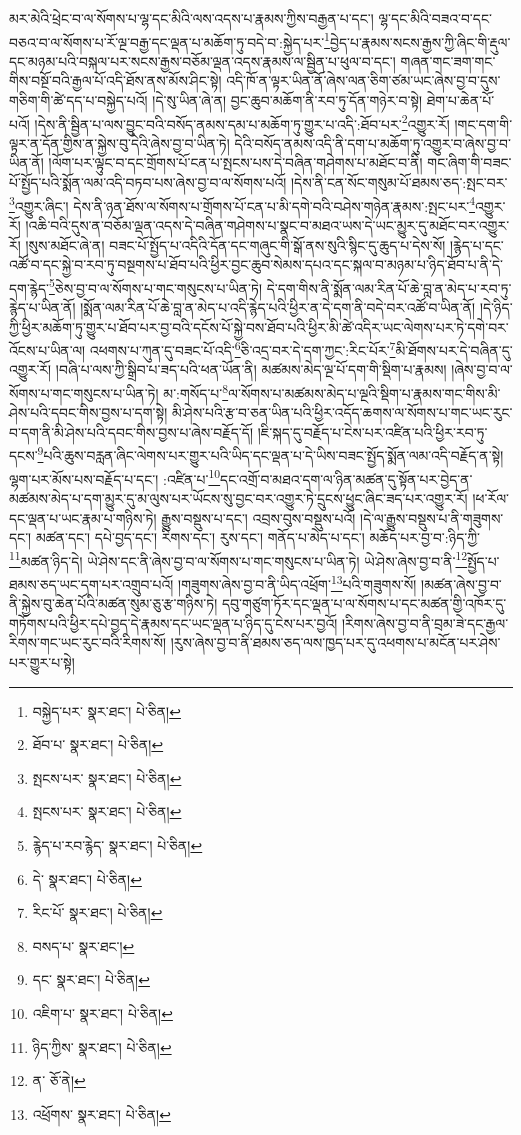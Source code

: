 མར་མེའི་ཕྲེང་བ་ལ་སོགས་པ་ལྷ་དང་མིའི་ལས་འདས་པ་རྣམས་ཀྱིས་བརྒྱན་པ་དང་། ལྷ་དང་མིའི་བཟའ་བ་དང་བཅའ་བ་ལ་སོགས་པ་རོ་ལྔ་བརྒྱ་དང་ལྡན་པ་མཆོག་ཏུ་བདེ་བ་:སྐྱེད་པར་\footnote{བསྐྱེད་པར་  སྣར་ཐང་།  པེ་ཅིན། }བྱེད་པ་རྣམས་སངས་རྒྱས་ཀྱི་ཞིང་གི་རྡུལ་དང་མཉམ་པའི་བསྐལ་པར་སངས་རྒྱས་བཅོམ་ལྡན་འདས་རྣམས་ལ་སྦྱིན་པ་ཕུལ་བ་དང་། གཞན་གང་ཟག་གང་གིས་བསྔོ་བའི་རྒྱལ་པོ་འདི་ཐོས་ནས་མོས་ཤིང་སྟེ། འདི་ཁོ་ན་ལྟར་ཡིན་ནོ་ཞེས་ལན་ཅིག་ཙམ་ཡང་ཞེས་བྱ་བ་དུས་གཅིག་གི་ཚེ་དད་པ་བསྐྱེད་པའོ། །དེ་སུ་ཡིན་ཞེ་ན། བྱང་ཆུབ་མཆོག་ནི་རབ་ཏུ་དོན་གཉེར་བ་སྟེ། ཐེག་པ་ཆེན་པོ་པའོ། །དེས་ནི་སྦྱིན་པ་ལས་བྱུང་བའི་བསོད་ནམས་དམ་པ་མཆོག་ཏུ་གྱུར་པ་འདི་:ཐོབ་པར་\footnote{ཐོབ་པ་  སྣར་ཐང་།  པེ་ཅིན། }འགྱུར་རོ། །གང་དག་གི་ལྟར་ན་དོན་གྱིས་ན་སྐྱེས་བུ་དེའི་ཞེས་བྱ་བ་ཡིན་ཏེ། དེའི་བསོད་ནམས་འདི་ནི་དག་པ་མཆོག་ཏུ་འགྱུར་བ་ཞེས་བྱ་བ་ཡིན་ནོ། །ལོག་པར་ལྟུང་བ་དང་གྲོགས་པོ་ངན་པ་སྤངས་པས་དེ་བཞིན་གཤེགས་པ་མཐོང་བ་ནི། གང་ཞིག་གི་བཟང་པོ་སྤྱོད་པའི་སྨོན་ལམ་འདི་བཏབ་པས་ཞེས་བྱ་བ་ལ་སོགས་པའོ། །དེས་ནི་ངན་སོང་གསུམ་པོ་ཐམས་ཅད་:སྤང་བར་\footnote{སྤངས་པར་  སྣར་ཐང་།  པེ་ཅིན། }འགྱུར་ཞིང་། དེས་ནི་ཉན་ཐོས་ལ་སོགས་པ་གྲོགས་པོ་ངན་པ་མི་དགེ་བའི་བཤེས་གཉེན་རྣམས་:སྤང་པར་\footnote{སྤངས་པར་  སྣར་ཐང་།  པེ་ཅིན། }འགྱུར་རོ། །འཆི་བའི་དུས་ན་བཅོམ་ལྡན་འདས་དེ་བཞིན་གཤེགས་པ་སྣང་བ་མཐའ་ཡས་དེ་ཡང་མྱུར་དུ་མཐོང་བར་འགྱུར་རོ། །སུས་མཐོང་ཞེ་ན། བཟང་པོ་སྤྱོད་པ་འདིའི་དོན་དང་གཞུང་གི་སྒོ་ནས་སུའི་སྙིང་དུ་ཆུད་པ་དེས་སོ། །རྙེད་པ་དང་འཚོ་བ་དང་སྐྱེ་བ་རབ་ཏུ་བསྔགས་པ་ཐོབ་པའི་ཕྱིར་བྱང་ཆུབ་སེམས་དཔའ་དང་སྐལ་བ་མཉམ་པ་ཉིད་ཐོབ་པ་ནི་དེ་དག་རྙེད་\footnote{རྙེད་པ་རབ་རྙེད་  སྣར་ཐང་།  པེ་ཅིན། }ཅེས་བྱ་བ་ལ་སོགས་པ་གང་གསུངས་པ་ཡིན་ཏེ། དེ་དག་གིས་ནི་སྨོན་ལམ་རིན་པོ་ཆེ་བླ་ན་མེད་པ་རབ་ཏུ་རྙེད་པ་ཡིན་ནོ། །སྨོན་ལམ་རིན་པོ་ཆེ་བླ་ན་མེད་པ་འདི་རྙེད་པའི་ཕྱིར་ན་དེ་དག་ནི་བདེ་བར་འཚོ་བ་ཡིན་ནོ། །དེ་ཉིད་ཀྱི་ཕྱིར་མཆོག་ཏུ་གྱུར་པ་ཐོབ་པར་བྱ་བའི་དངོས་པོ་སྐྱེ་བས་ཐོབ་པའི་ཕྱིར་མི་ཚེ་འདིར་ཡང་ལེགས་པར་ཏེ་དགེ་བར་འོངས་པ་ཡིན་ལ། འཕགས་པ་ཀུན་དུ་བཟང་པོ་འདི་\footnote{དེ་  སྣར་ཐང་།  པེ་ཅིན། }ཅི་འདྲ་བར་དེ་དག་ཀྱང་:རིང་པོར་\footnote{རིང་པོ་  སྣར་ཐང་།  པེ་ཅིན། }མི་ཐོགས་པར་དེ་བཞིན་དུ་འགྱུར་རོ། །བཞི་པ་ལས་ཀྱི་སྒྲིབ་པ་ཟད་པའི་ཕན་ཡོན་ནི། མཚམས་མེད་ལྔ་པོ་དག་གི་སྡིག་པ་རྣམས། །ཞེས་བྱ་བ་ལ་སོགས་པ་གང་གསུངས་པ་ཡིན་ཏེ། མ་:གསོད་པ་\footnote{བསད་པ་  སྣར་ཐང་། }ལ་སོགས་པ་མཚམས་མེད་པ་ལྔའི་སྡིག་པ་རྣམས་གང་གིས་མི་ཤེས་པའི་དབང་གིས་བྱས་པ་དག་སྟེ། མི་ཤེས་པའི་རྩ་བ་ཅན་ཡིན་པའི་ཕྱིར་འདོད་ཆགས་ལ་སོགས་པ་གང་ཡང་རུང་བ་དག་ནི་མི་ཤེས་པའི་དབང་གིས་བྱས་པ་ཞེས་བརྗོད་དོ། །ཇི་སྐད་དུ་བརྗོད་པ་ངེས་པར་འཛིན་པའི་ཕྱིར་རབ་ཏུ་དངས་\footnote{དང་  སྣར་ཐང་།  པེ་ཅིན། }པའི་ཆུས་བརླན་ཞིང་ལེགས་པར་གྱུར་པའི་ཡིད་དང་ལྡན་པ་དེ་ཡིས་བཟང་སྤྱོད་སྨོན་ལམ་འདི་བརྗོད་ན་སྟེ། ལྷག་པར་མོས་པས་བརྗོད་པ་དང་། :འཛིན་པ་\footnote{འཇིག་པ་  སྣར་ཐང་།  པེ་ཅིན། }དང་འགྲོ་བ་མཐའ་དག་ལ་ཉིན་མཚན་དུ་སྟོན་པར་བྱེད་ན་མཚམས་མེད་པ་དག་མྱུར་དུ་མ་ལུས་པར་ཡོངས་སུ་བྱང་བར་འགྱུར་ཏེ་དྲུངས་ཕྱུང་ཞིང་ཟད་པར་འགྱུར་རོ། །ཕ་རོལ་དང་ལྡན་པ་ཡང་རྣམ་པ་གཉིས་ཏེ། རྒྱུས་བསྡུས་པ་དང་། འབྲས་བུས་བསྡུས་པའོ། །དེ་ལ་རྒྱུས་བསྡུས་པ་ནི་གཟུགས་དང་། མཚན་དང་། དཔེ་བྱད་དང་། རིགས་དང་། རུས་དང་། གནོད་པ་མེད་པ་དང་། མཆོད་པར་བྱ་བ་:ཉིད་ཀྱི་\footnote{ཉིད་ཀྱིས་  སྣར་ཐང་།  པེ་ཅིན། }མཚན་ཉིད་དེ། ཡེ་ཤེས་དང་ནི་ཞེས་བྱ་བ་ལ་སོགས་པ་གང་གསུངས་པ་ཡིན་ཏེ། ཡེ་ཤེས་ཞེས་བྱ་བ་ནི་\footnote{ན་  ཅོ་ནེ། }སྤྱོད་པ་ཐམས་ཅད་ཡང་དག་པར་འགྲུབ་པའོ། །གཟུགས་ཞེས་བྱ་བ་ནི་ཡིད་འཕྲོག་\footnote{འཕྲོགས་  སྣར་ཐང་།  པེ་ཅིན། }པའི་གཟུགས་སོ། །མཚན་ཞེས་བྱ་བ་ནི་སྐྱེས་བུ་ཆེན་པོའི་མཚན་སུམ་ཅུ་རྩ་གཉིས་ཏེ། དབུ་གཙུག་ཏོར་དང་ལྡན་པ་ལ་སོགས་པ་དང་མཚན་གྱི་འཁོར་དུ་གཏོགས་པའི་ཕྱིར་དཔེ་བྱད་དེ་རྣམས་དང་ཡང་ལྡན་པ་ཉིད་དུ་ངེས་པར་བྱའོ། །རིགས་ཞེས་བྱ་བ་ནི་བྲམ་ཟེ་དང་རྒྱལ་རིགས་གང་ཡང་རུང་བའི་རིགས་སོ། །རུས་ཞེས་བྱ་བ་ནི་ཐམས་ཅད་ལས་ཁྱད་པར་དུ་འཕགས་པ་མངོན་པར་ཤེས་པར་གྱུར་པ་སྟེ། 